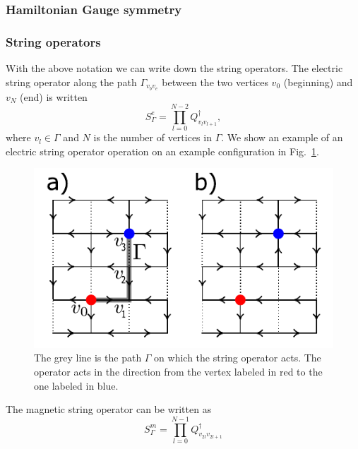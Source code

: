 \documentclass[twocolumn,prb,aps,floatfix,superscriptaddress]{revtex4-1}
\begin{document}
        \subsubsection{Hamiltonian Gauge symmetry }


        \subsubsection{String operators}
            With the above notation we can write down the string operators. The electric string operator along
            the path $\Gamma_{v_b v_e}$ between the two vertices $v_0$ (beginning) and $v_N$ (end) is written
            \begin{equation}
                S^e_{\Gamma} = \prod_{l=0}^{N-2} Q_{v_lv_{l+1}}^\dagger
                ,
            \end{equation}
            where $v_l \in \Gamma$ and $N$ is the number of vertices in $\Gamma$. We show an example of an
            electric string operator operation on an example configuration in Fig.~\ref{fig:example_elec_string}.
            \begin{figure}[htpb]
                \centering
                \includegraphics[width=0.8\linewidth]{example_elec_string.pdf}
                \caption{The grey line is the path $\Gamma$ on which the string operator acts. The operator acts
            in the direction from the vertex labeled in red to the one labeled in blue.}
                \label{fig:example_elec_string}
            \end{figure}
            The magnetic string operator can be written as
            \begin{equation}
                S^m_{\Gamma} = \prod_{l=0}^{N-1} Q_{v_{2l}v_{2l+1}}^\dagger
            \end{equation}
\end{document}
